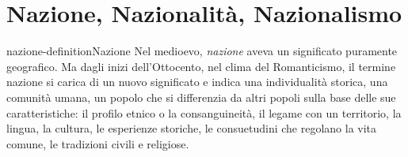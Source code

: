 \documentclass[preview]{standalone}
\begin{document}
\section{Nazione, Nazionalità, Nazionalismo}

\begin{snippetdefinition}{nazione-definition}{Nazione}
    Nel medioevo, \textit{nazione} aveva un significato puramente geografico.
    Ma dagli inizi dell'Ottocento, nel clima del Romanticismo, il
    termine nazione si carica di un nuovo significato e indica una individualità storica, una
    comunità umana, un popolo che si differenzia da altri popoli sulla base delle sue
    caratteristiche: il profilo etnico o la consanguineità, il legame con un territorio, la lingua, la
    cultura, le esperienze storiche, le consuetudini che regolano la vita comune, le tradizioni
    civili e religiose.
\end{snippetdefinition}
\end{document}

